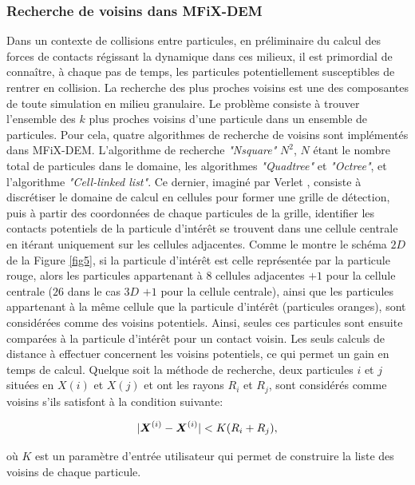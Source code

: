 \subsubsection*{Recherche de voisins dans MFiX-DEM}

Dans un contexte de collisions entre particules, en préliminaire du calcul des forces de contacts régissant la dynamique dans ces milieux, il est primordial de connaître, à chaque pas de temps, les particules potentiellement susceptibles de rentrer en collision. La recherche des plus proches voisins est une des composantes de toute simulation en milieu granulaire. Le problème consiste à trouver l'ensemble des $k$ plus proches voisins d'une particule dans un ensemble de particules. Pour cela, quatre algorithmes de recherche de voisins sont implémentés dans MFiX-DEM. L'algorithme de recherche \textit{"Nsquare"} $N^2$, $N$ étant le nombre total de particules dans le domaine, les algorithmes \textit{"Quadtree"} et \textit{"Octree"}, et l'algorithme \textit{"Cell-linked list"}. Ce dernier, imaginé par Verlet \cite{verlet1967computer}, consiste à discrétiser le domaine de calcul en cellules pour former une grille de détection, puis à partir des coordonnées de chaque particules de la grille, identifier les contacts potentiels de la particule d'intérêt se trouvent dans une cellule centrale en itérant uniquement sur les cellules adjacentes. Comme le montre le schéma $2D$ de la Figure \ref{fig5}, si la particule d'intérêt est celle représentée par la particule rouge, alors les particules appartenant à $8$ cellules adjacentes $+1$ pour la cellule centrale ($26$ dans le cas $3D$ $+1$ pour la cellule centrale), ainsi que les particules appartenant à la même cellule que la particule d'intérêt (particules oranges), sont considérées comme des voisins potentiels. Ainsi, seules ces particules sont ensuite comparées à la particule d'intérêt pour un contact voisin. Les seuls calculs de distance à effectuer concernent les voisins potentiels, ce qui permet un gain en temps de calcul. Quelque soit la méthode de recherche, deux particules $i$ et $j$ situées en $X(i)$ et $X(j)$ et ont les rayons $R_i$ et $R_j$, sont considérés comme voisins s'ils satisfont à la condition suivante:

\begin{equation} \label{eq: 1}
|\boldsymbol{X}^{(i)} - \boldsymbol{X}^{(i)}| < K (R_i + R_j),
\end{equation}

\noindent où $K$ est un paramètre d'entrée utilisateur qui permet de construire la liste des voisins de chaque particule.


